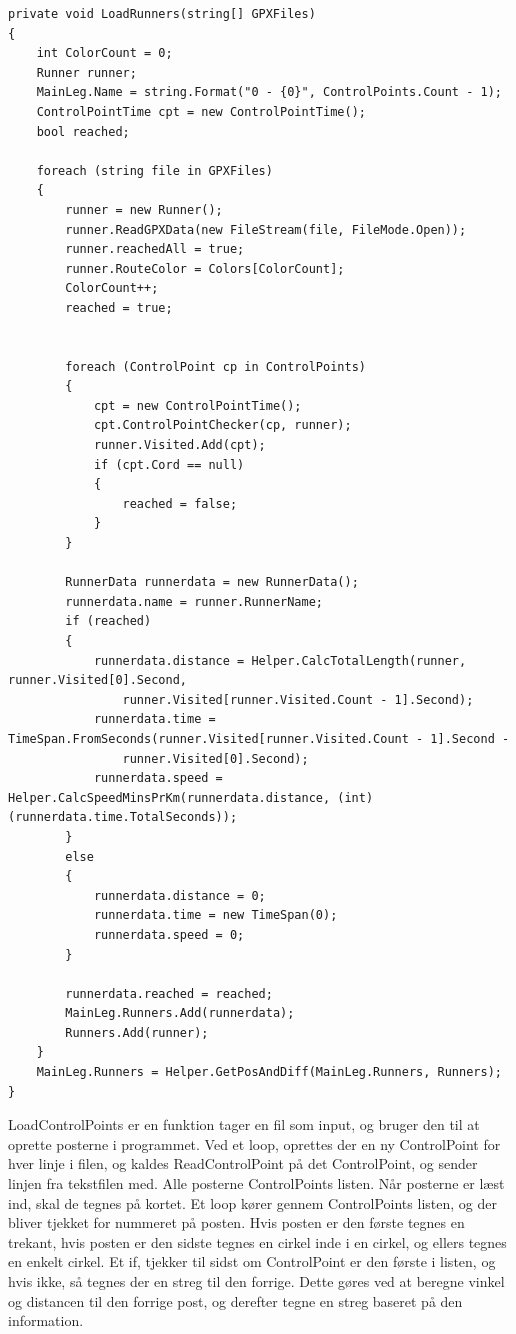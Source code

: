 \begin{lstlisting}
private void LoadRunners(string[] GPXFiles)
{
    int ColorCount = 0;
    Runner runner;
    MainLeg.Name = string.Format("0 - {0}", ControlPoints.Count - 1);
    ControlPointTime cpt = new ControlPointTime();
    bool reached;

    foreach (string file in GPXFiles)
    {
        runner = new Runner();
        runner.ReadGPXData(new FileStream(file, FileMode.Open));
        runner.reachedAll = true;
        runner.RouteColor = Colors[ColorCount];
        ColorCount++;
        reached = true;


        foreach (ControlPoint cp in ControlPoints)
        {
            cpt = new ControlPointTime();
            cpt.ControlPointChecker(cp, runner);
            runner.Visited.Add(cpt);
            if (cpt.Cord == null)
            {
                reached = false;
            }
        }

        RunnerData runnerdata = new RunnerData();
        runnerdata.name = runner.RunnerName;
        if (reached)
        {
            runnerdata.distance = Helper.CalcTotalLength(runner, runner.Visited[0].Second,
                runner.Visited[runner.Visited.Count - 1].Second);
            runnerdata.time = TimeSpan.FromSeconds(runner.Visited[runner.Visited.Count - 1].Second -
                runner.Visited[0].Second);
            runnerdata.speed = Helper.CalcSpeedMinsPrKm(runnerdata.distance, (int)(runnerdata.time.TotalSeconds));
        }
        else
        {
            runnerdata.distance = 0;
            runnerdata.time = new TimeSpan(0);
            runnerdata.speed = 0;
        }

        runnerdata.reached = reached;
        MainLeg.Runners.Add(runnerdata);
        Runners.Add(runner);
    }
    MainLeg.Runners = Helper.GetPosAndDiff(MainLeg.Runners, Runners);
}
\end{lstlisting}

LoadControlPoints er en funktion  tager en fil som input, og bruger den til at oprette posterne i programmet. Ved et loop, oprettes der en ny ControlPoint for hver linje i filen, og kaldes ReadControlPoint på det ControlPoint, og sender linjen fra tekstfilen med. Alle posterne ControlPoints listen.
Når posterne er læst ind, skal de tegnes på kortet. Et loop kører gennem ControlPoints listen, og der bliver tjekket for nummeret på posten. Hvis posten er den første tegnes en trekant, hvis posten er den sidste tegnes en cirkel inde i en cirkel, og ellers tegnes en enkelt cirkel. 
Et if, tjekker til sidst om ControlPoint er den første i listen, og hvis ikke, så tegnes der en streg til den forrige. Dette gøres ved at beregne vinkel og distancen til den forrige post, og derefter tegne en streg baseret på den information. 

